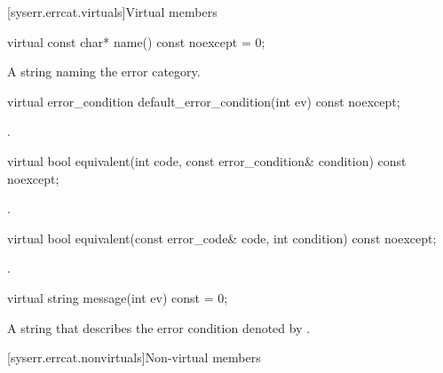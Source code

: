 [syserr.errcat.virtuals]{Virtual members}

%
\begin{itemdecl}
virtual const char* name() const noexcept = 0;
\end{itemdecl}

\begin{itemdescr}
\pnum
\returns
A string naming the error category.
\end{itemdescr}

%
\begin{itemdecl}
virtual error_condition default_error_condition(int ev) const noexcept;
\end{itemdecl}

\begin{itemdescr}
\pnum
\returns
{}.
\end{itemdescr}

%
\begin{itemdecl}
virtual bool equivalent(int code, const error_condition& condition) const noexcept;
\end{itemdecl}

\begin{itemdescr}
\pnum
\returns
{}.
\end{itemdescr}

%
\begin{itemdecl}
virtual bool equivalent(const error_code& code, int condition) const noexcept;
\end{itemdecl}

\begin{itemdescr}
\pnum
\returns
{}.
\end{itemdescr}

%
\begin{itemdecl}
virtual string message(int ev) const = 0;
\end{itemdecl}

\begin{itemdescr}
\pnum
\returns
A string that describes the error condition denoted by .
\end{itemdescr}

[syserr.errcat.nonvirtuals]{Non-virtual members}

